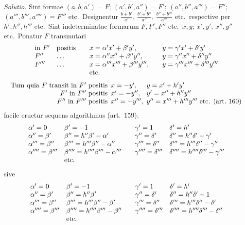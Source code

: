 \emph{Solutio.} Sint formae $(a,b,a')=F$; $(a',b',a'')=F'$; $(a'',b'',a''')=F''$; $(a''',b''',a'''')=F'''$ etc.\ Designentur $\frac{b+b'}{a'}$, $\frac{b'+b''}{a''}$, $\frac{b''+b'''}{a'''}$ etc.\ respective per $h',h'',h'''$ etc.\ Sint indeterminatae formarum $F,F',F''$ etc.\ $x,y$; $x',y'$; $x'',y''$ etc.\ Ponatur $F$ transmutari
\[
\begin{array}{ll@{\qquad}l@{\qquad}l}
\text{in }F'&\text{positis}&x=\alpha'x'+\beta'y',&y=\gamma'x'+\delta'y'\\
F''&\ldots&x=\alpha''x''+\beta''y'',&y=\gamma''x''+\delta''y''\\
F'''&\ldots&x=\alpha'''x'''+\beta'''y''',&y=\gamma'''x'''+\delta'''y'''\\
&&\text{etc.}&
\end{array}
\]
{\small\setlength{\arraycolsep}{3pt}
\[
\begin{array}{l@{\enspace}l@{\enspace}l}
\text{Tum quia }F\text{ transit in }F'\text{ positis}&x=-y',&y=x'+h'y'\\
\hfill F'\text{ in }F''\text{ positis}&x'=-y'',&y'=x''+h''y''\\
\hfill F''\text{ in }F'''\text{ positis}&x''=-y''',&y''=x'''+h'''y'''\text{ etc. (art.\ 160)}
\end{array}
\]
}
facile eruetur sequens algorithmus (art.\ 159):
\[
\begin{array}{ll@{\qquad}ll}
\alpha'=0&\beta'=-1&\gamma'=1&\delta'=h'\\
\alpha''=\beta'&\beta''=h''\beta'-\alpha'&\gamma''=\delta'&\delta''=h''\delta'-\gamma'\\
\alpha'''=\beta''&\beta'''=h'''\beta''-\alpha''&\gamma'''=\delta''&\delta'''=h'''\delta''-\gamma''\\
\alpha''''=\beta'''&\beta''''=h''''\beta'''-\alpha'''&\gamma''''=\delta'''&\delta''''=h''''\delta'''-\gamma'''\\
&\text{etc.}&&
\end{array}
\]
sive
\[
\begin{array}{ll@{\qquad}ll}
\alpha'=0&\beta'=-1&\gamma'=1&\delta'=h'\\
\alpha''=\beta'&\beta''=h''\beta'&\gamma''=\delta'&\delta''=h''\delta'-1\\
\alpha'''=\beta''&\beta'''=h'''\beta''-\beta'&\gamma'''=\delta''&\delta'''=h'''\delta''-\delta'\\
\alpha''''=\beta'''&\beta''''=h''''\beta'''-\beta''&\gamma''''=\delta'''&\delta''''=h''''\delta'''-\delta''\\
&\text{etc.}&&
\end{array}
\]

